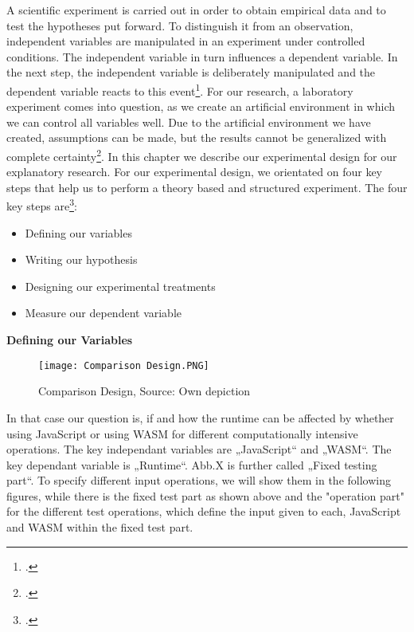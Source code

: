 A scientific experiment is carried out in order to obtain empirical data and to test the hypotheses put forward. To distinguish it from an observation, independent variables are manipulated in an experiment under controlled conditions. The independent variable in turn influences a dependent variable. In the next step, the independent variable is deliberately manipulated and the dependent variable reacts to this event\footcite{genau_experiment_2018}.
For our research, a laboratory experiment comes into question, as we create an artificial environment in which we can control all variables well. Due to the artificial environment we have created, assumptions can be made, but the results cannot be generalized with complete certainty\footcite{genau_experiment_2018}.
In this chapter we describe our experimental design for our explanatory research. 
For our experimental design, we orientated on four key steps that help us to perform a theory based and structured experiment. The four key steps are\footcite{bevans_guide_2019}:
\begin{itemize}
    \item Defining our variables
    \item Writing our hypothesis
    \item Designing our experimental treatments
    \item Measure our dependent variable
\end{itemize}

\newpage

\textbf{Defining our Variables} \newline

\begin{figure}[H]
    \centering
    \texttt{[image: Comparison Design.PNG]}
    \caption{Comparison Design, Source: Own depiction}
	\label{fig:compdesign}
\end{figure}

In that case our question is, if and how the runtime can be affected by whether using JavaScript or using WASM for different computationally intensive operations. The key independant variables are „JavaScript“ and „WASM“. The key dependant variable is „Runtime“. Abb.X is further called „Fixed testing part“.
To specify different input operations, we will show them in the following figures, while there is the fixed test part as shown above and the "operation part" for the different test operations, which define the input given to each, JavaScript and WASM within the fixed test part.

